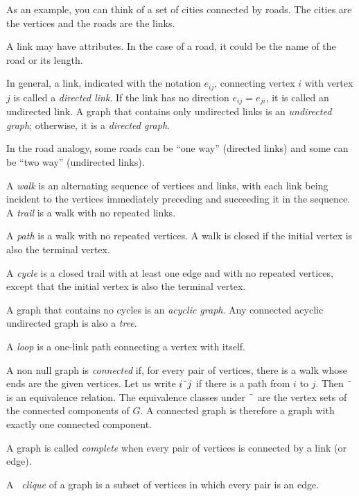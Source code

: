 \documentclass[justified, sixbynine]{tufte-book}
\theoremstyle{plain}%
\newtheorem * {corollary}{Corollary}
\theoremstyle{definition}
\theoremstyle{remark}
\newtheorem * {remark}{Remark}
\newtheorem * {note}{Note}
\begin{document}
\begin{fullwidth}
As an example, you can think of a set of cities connected by roads. The cities are the vertices and the roads are the links.

A link may have attributes. In the case of a road, it could be the name of the road or its length.

In general, a link, indicated with the notation $e_{ij}$, connecting vertex $%
i $ with vertex $j$ is called a {\it directed link}. If the link has no
direction $e_{ij}=e_{ji}$, it is called an undirected link. A graph that
contains only undirected links is an {\it undirected graph}; otherwise, it is
a {\it directed graph}.

In the road analogy, some roads can be ``one way'' (directed links) and some can be ``two way'' (undirected links).

A {\it walk} is an alternating sequence of vertices and links, with each
link being incident to the vertices immediately preceding and succeeding it
in the sequence. A {\it trail} is a walk with no repeated links.

A {\it path} is a walk with no repeated vertices. A walk is closed if the
initial vertex is also the terminal vertex.

A {\it cycle} is a closed trail with at least one edge and with no repeated
vertices, except that the initial vertex is also the terminal vertex.

A graph that contains no cycles is an {\it acyclic graph}. Any connected
acyclic undirected graph is also a {\it tree}.


A {\it loop} is a one-link path connecting a vertex with itself.


A non null graph is {\it connected} if, for every pair of vertices, there is
a walk whose ends are the given vertices. Let us write $i%
\symbol{126}j$ if there is a path from $i$ to $j$. Then $\symbol{126}$ is an
equivalence relation. The equivalence classes under $\symbol{126}$ are the
vertex sets of the connected components of $G$. A connected graph is therefore
a graph with exactly one connected component.


A graph is called {\it complete} when every pair of vertices is connected by
a link (or edge).


A {\it \ clique } of a graph is a subset of vertices in which every pair is an
edge.


\end{fullwidth}
\end{document}
